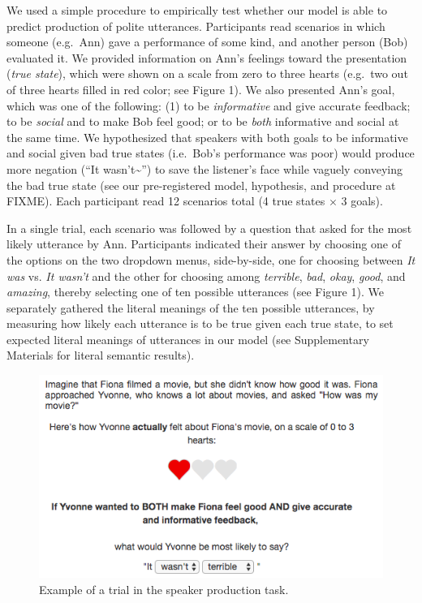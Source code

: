 \documentclass[english,floatsintext,man]{apa6}
\theoremstyle{definition}
\theoremstyle{definition}
\theoremstyle{definition}
\theoremstyle{remark}
\begin{document}
We used a simple procedure to empirically test whether our model is able
to predict production of polite utterances. Participants read scenarios
in which someone (e.g.~Ann) gave a performance of some kind, and another
person (Bob) evaluated it. We provided information on Ann's feelings
toward the presentation (\emph{true state}), which were shown on a scale
from zero to three hearts (e.g.~two out of three hearts filled in red
color; see Figure 1). We also presented Ann's goal, which was one of the
following: (1) to be \emph{informative} and give accurate feedback; to
be \emph{social} and to make Bob feel good; or to be \emph{both}
informative and social at the same time. We hypothesized that speakers
with both goals to be informative and social given bad true states
(i.e.~Bob's performance was poor) would produce more negation
(\enquote{It wasn't\textasciitilde{}}) to save the listener's face while
vaguely conveying the bad true state (see our pre-registered model,
hypothesis, and procedure at FIXME). Each participant read 12 scenarios
total (4 true states \(\times\) 3 goals).

In a single trial, each scenario was followed by a question that asked
for the most likely utterance by Ann. Participants indicated their
answer by choosing one of the options on the two dropdown menus,
side-by-side, one for choosing between \emph{It was} vs. \emph{It
wasn't} and the other for choosing among \emph{terrible}, \emph{bad},
\emph{okay}, \emph{good}, and \emph{amazing}, thereby selecting one of
ten possible utterances (see Figure 1). We separately gathered the
literal meanings of the ten possible utterances, by measuring how likely
each utterance is to be true given each true state, to set expected
literal meanings of utterances in our model (see Supplementary Materials
for literal semantic results).

\begin{figure}
\centering
\includegraphics{fig/screenshot.png}
\caption{Example of a trial in the speaker production task.}
\end{figure}
\end{document}
